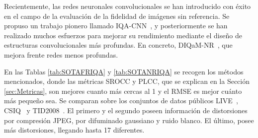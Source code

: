 Recientemente, las redes neuronales convolucionales se han introducido con 
éxito en el campo de la evaluación de la fidelidad de imágenes sin referencia. 
Se propuso un trabajo pionero llamado IQA-CNN~\cite{IQA-CNN}, 
y posteriormente se han realizado muchos esfuerzos para mejorar su rendimiento 
mediante el diseño de estructuras convolucionales más profundas. En concreto,
DIQaM-NR~\cite{DIQaM}, que mejora frente redes menos profundas.

En las Tablas \ref{tab:SOTAFRIQA} y \ref{tab:SOTANRIQA} se recogen los 
métodos mencionados, donde las métricas SROCC y PLCC, que se explican 
en la Sección \ref{sec:Metricas}, son mejores cuanto más cercas al 1 y 
el RMSE es mejor cuánto más pequeño sea.  Se comparan sobre los conjuntos de datos públicos
LIVE~\cite{LIVE, LIVE1, SSIM}, CSIQ~\cite{CSIQ} y TID2008~\cite{TID2008}. El primero y el segundo poseen información de distorsiones por compresión JPEG, por difuminado gaussiano y ruido blanco. El último, posee más distorsiones, llegando hasta 17 diferentes.

